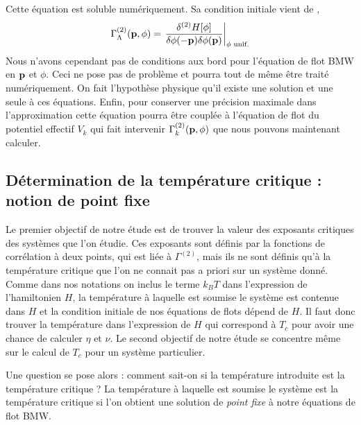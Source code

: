 \documentclass[10.5pt]{article}
\begin{document}
\begin{multicols*}{2}
Cette équation est soluble numériquement. Sa condition initiale vient de ,  
\begin{equation}
	\Gamma^{(2)}_\Lambda({\bf p}, \phi) = \left. \frac{\delta ^{(2)}H[\phi]}{\delta \phi(-{\bf p})\delta\phi({\bf p})} \right|_{\phi \text{ unif.}}
	\label{eq:initBMW}
\end{equation}
Nous n'avons cependant pas de conditions aux bord pour l'équation de flot BMW en ${\bf p}$ et $\phi$. Ceci ne pose pas de problème et pourra tout de même être traité numériquement. On fait l'hypothèse physique qu'il existe une solution et une seule à ces équations. Enfin, pour conserver une précision maximale dans l'approximation cette équation pourra être couplée à l'équation de flot du potentiel effectif $V_k$ qui fait intervenir $\Gamma_k^{(2)}({\bf p}, \phi)$ que nous pouvons maintenant calculer.



\vspace*{11pt}
\subsection{Détermination de la température critique : notion de point fixe}

\label{sec:ptfixe}

Le premier objectif de notre étude est de trouver la valeur des exposants critiques des systèmes que l'on étudie. Ces exposants sont définis par la fonctions de corrélation à deux points, qui est liée à $\Gamma^{(2)}$, mais ils ne sont définis qu'à la température critique que l'on ne connait pas a priori sur un système donné. Comme dans nos notations on inclus le terme $k_BT$ dans l'expression de l'hamiltonien $H$, la température à laquelle est soumise le système est contenue dans $H$ et la condition initiale de nos équations de flots dépend de $H$. Il faut donc trouver la température dans l'expression de $H$ qui correspond à $T_c$ pour avoir une chance de calculer $\eta$ et $\nu$. Le second objectif de notre étude se concentre même sur le calcul de $T_c$ pour un système particulier. 

Une question se pose alors : comment sait-on si la température introduite est la température critique ? La température à laquelle est soumise le système est la température critique si l'on obtient une solution de \textit{point fixe} à notre équations de flot BMW. \\


\end{multicols*}
\end{document}
